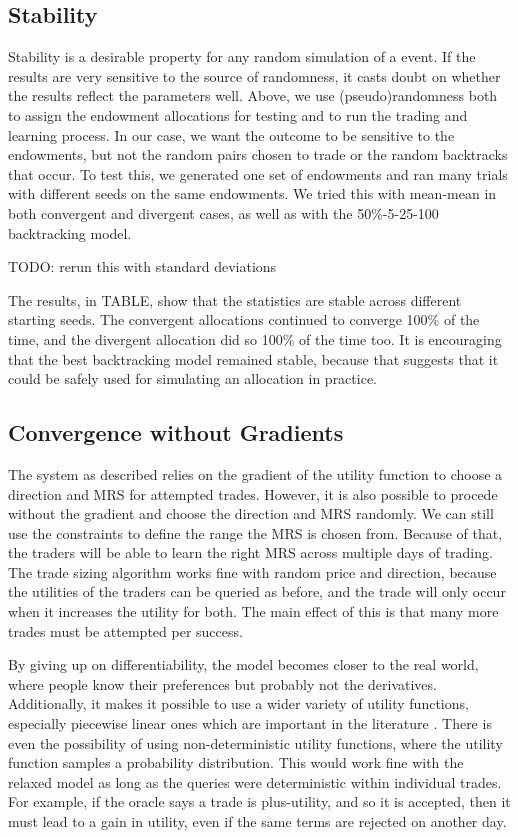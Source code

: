 \documentclass[12pt,a4paper,titlepage]{article}
\begin{document}
\subsection{Stability}
Stability is a desirable property for any random simulation of a event.
If the results are very sensitive to the source of randomness, it casts doubt on whether the results reflect the parameters well.
Above, we use (pseudo)randomness both to assign the endowment allocations for testing and to run the trading and learning process.
In our case, we want the outcome to be sensitive to the endowments, but not the random pairs chosen to trade or the random backtracks that occur. 
To test this, we generated one set of endowments and ran many trials with different seeds on the same endowments.
We tried this with mean-mean in both convergent and divergent cases, as well as with the 50\%-5-25-100 backtracking model.

TODO: rerun this with standard deviations

The results, in TABLE, show that the statistics are stable across different starting seeds.
The convergent allocations continued to converge 100\% of the time, and the divergent allocation did so 100\% of the time too.
It is encouraging that the best backtracking model remained stable, because that suggests that it could be safely used for simulating an allocation in practice.

\subsection{Convergence without Gradients}\label{nograd}
The system as described relies on the gradient of the utility function to choose a direction and MRS for attempted trades.
However, it is also possible to procede without the gradient and choose the direction and MRS randomly.
We can still use the constraints to define the range the MRS is chosen from.
Because of that, the traders will be able to learn the right MRS across multiple days of trading.
The trade sizing algorithm works fine with random price and direction, because the utilities of the traders can be queried as before, and the trade will only occur when it increases the utility for both.
The main effect of this is that many more trades must be attempted per success.

By giving up on differentiability, the model becomes closer to the real world, where people know their preferences but probably not the derivatives.
Additionally, it makes it possible to use a wider variety of utility functions, especially piecewise linear ones which are important in the literature \cite{chen}.
There is even the possibility of using non-deterministic utility functions, where the utility function samples a probability distribution.
This would work fine with the relaxed model as long as the queries were deterministic within individual trades.
For example, if the oracle says a trade is plus-utility, and so it is accepted, then it must lead to a gain in utility, even if the same terms are rejected on another day.
\end{document}
